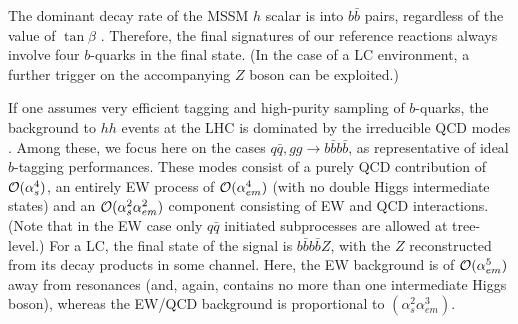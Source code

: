 The dominant decay rate of the MSSM $h$ scalar is into $b\bar b$
pairs, regardless of the value of $\tan\beta$ \cite{BRs}.  Therefore,
the final signatures of our reference reactions always involve four
$b$-quarks in the final state. (In the case of a LC environment, a
further trigger on the accompanying $Z$ boson can be exploited.)  

If one assumes very efficient tagging and high-purity sampling of
$b$-quarks, the background to $hh$ events at the LHC is dominated by
the irreducible QCD modes \cite{ATLTDR}. Among these, we focus here 
on the cases $q\bar q,gg\to b\bar b b\bar b$, as representative of
ideal $b$-tagging performances. These modes
consist of a purely QCD contribution
of ${\cal O}(\alpha_s^4)$, an entirely EW process of ${\cal
  O}(\alpha_{em}^4)$ (with no double
Higgs intermediate states) and an ${\cal O}(\alpha_s^2\alpha_{em}^2)$
component consisting of EW and QCD interactions.  (Note that in the EW
case only $q\bar q$ initiated subprocesses are allowed at tree-level.)
For a LC, the final state of the signal  is $ b\bar b b\bar b Z$, with
the $Z$ reconstructed from its decay products in some channel. Here, the EW
background is of ${\cal O}(\alpha_{em}^5)$ away from resonances
(and, again, contains no more than one intermediate Higgs boson), whereas
the EW/QCD background is proportional to $(\alpha_s^2\alpha_{em}^3)$.

